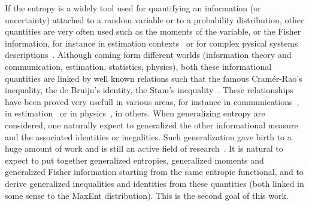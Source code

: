 \documentclass[english,sort&compress]{elsarticle}
\theoremstyle{definition}
\theoremstyle{plain}
\theoremstyle{plain}
\begin{document}
If  the  entropy is  a  widely  tool used  for  quantifying  an information  (or
uncertainty) attached  to a  random variable or  to a  probability distribution,
other quantities are very often used such as the moments of the variable, or the
Fisher information,  for instance in estimation  contexts~\cite{Kay93, Fri04} or
for  complex  pysical   systems  descriptions~\cite{Fri04,  VigBer03,  RomAng99,
  RomSan06,  SanGon06,   TorLop15}.   Although  coming   form  different  worlds
(information  theory and communication,  estimation, statistics,  physics), both
these informational quantities are linked  by well known relations such that the
famous  Cram\'er-Rao's   inequality,  the  de  Bruijn's   identity,  the  Stam's
inequality~\cite{CovTho06, Sta59, DemCov91, GuoSha05}.  These relationships have
been    proved   very   usefull    in   various    areas,   for    instance   in
communications~\cite{Sta59,  DemCov91, CovTho06}, in  estimation~\cite{Kay93} or
in  physics~\cite{FolSit97, Sen11},  in  others. When  generalizing entropy  are
considered, one naturally expect  to generalized the other informational measure
and the associated identities or inegalities.  Such generalization gave birth to
a huge  amount of  work and  is still an  active field  of research~\cite{Vaj73,
  Boe77,  Ham78,  BoeVan80,  BurRao82,  LutYan04, LutYan05,  LutYan07,  LutLv12,
  Ber12:06_1,  Ber12:06_2, Ber13,  Ber13:08}.  It  is natural  to expect  to put
together  generalized  entropies,  generalized  moments and  generalized  Fisher
information  starting   from  the  same  entropic  functional,   and  to  derive
generalized inequalities  and identities from  these quantities (both  linked in
some sense to the MaxEnt distribution).  This is the second goal of this work.
\end{document}
